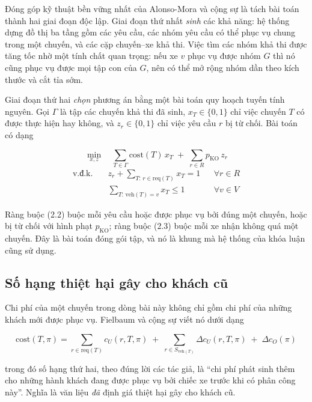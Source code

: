 Đóng góp kỹ thuật bền vững nhất của Alonso-Mora và cộng sự \cite{alonsomora2017} là tách bài
toán thành hai giai đoạn độc lập. Giai đoạn thứ nhất \emph{sinh} các khả năng: hệ thống dựng
đồ thị ba tầng gồm các yêu cầu, các nhóm yêu cầu có thể phục vụ chung trong một chuyến, và các
cặp chuyến--xe khả thi. Việc tìm các nhóm khả thi được tăng tốc nhờ một tính chất quan trọng:
nếu xe $v$ phục vụ được nhóm $G$ thì nó cũng phục vụ được mọi tập con của $G$, nên có thể mở
rộng nhóm dần theo kích thước và cắt tỉa sớm.

Giai đoạn thứ hai \emph{chọn} phương án bằng một bài toán quy hoạch tuyến tính nguyên. Gọi
$\Gamma$ là tập các chuyến khả thi đã sinh, $x_T \in \{0,1\}$ chỉ việc chuyến $T$ có được thực
hiện hay không, và $z_r \in \{0,1\}$ chỉ việc yêu cầu $r$ bị từ chối. Bài toán có dạng

\begin{equation}
\min_{x,z} \quad \sum_{T \in \Gamma} \mathrm{cost}(T)\, x_T \;+\; \sum_{r \in R} p_{\mathrm{KO}}\, z_r
\end{equation}
\begin{align}
\text{v.đ.k.}\quad & z_r + \sum_{T:\, r \in \mathrm{req}(T)} x_T = 1 && \forall r \in R\\
& \sum_{T:\, \mathrm{veh}(T)=v} x_T \le 1 && \forall v \in V
\end{align}

Ràng buộc (2.2) buộc mỗi yêu cầu hoặc được phục vụ bởi đúng một chuyến, hoặc bị từ chối với
hình phạt $p_{\mathrm{KO}}$; ràng buộc (2.3) buộc mỗi xe nhận không quá một chuyến. Đây là bài
toán đóng gói tập, và nó là khung mà hệ thống của khóa luận cũng sử dụng.

\subsection{Số hạng thiệt hại gây cho khách cũ}

Chi phí của một chuyến trong dòng bài này không chỉ gồm chi phí của những khách mới được phục
vụ. Fielbaum và cộng sự \cite{fielbaum2022scale} viết nó dưới dạng

\begin{equation}
\mathrm{cost}(T,\pi) = \sum_{r \in \mathrm{req}(T)} c_U(r,T,\pi)
\;+\; \sum_{r \in S_{\mathrm{veh}(T)}} \Delta c_U(r,T,\pi)
\;+\; \Delta c_O(\pi)
\end{equation}

trong đó số hạng thứ hai, theo đúng lời các tác giả, là ``chi phí phát sinh thêm cho những hành
khách đang được phục vụ bởi chiếc xe trước khi có phân công này''. Nghĩa là văn liệu \emph{đã}
định giá thiệt hại gây cho khách cũ.

